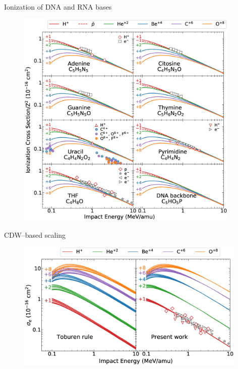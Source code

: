 \documentclass[final]{beamer}
\begin{document}
\begin{frame}[t]
\begin{columns}[t]
\begin{column}{.44\textwidth}
\begin{block}{Ionization of DNA and RNA bases}
\begin{figure}
\centering
\includegraphics[width=0.95\textwidth]{figures/adn_all.eps} 
\end{figure}

\end{block}
\begin{block}{CDW--based scaling}
\justify

\begin{figure}
\centering
\includegraphics[width=0.98\textwidth]{figures/molscaling85.eps} 
\end{figure}


\end{block}
\end{column}
\end{columns}
\end{frame}
\end{document}
